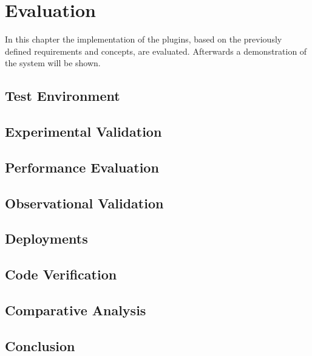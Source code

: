 \acresetall

\chapter{Evaluation}\label{chapter:evaluation}
In this chapter the implementation of the plugins, based on the previously defined requirements and concepts, are evaluated.
Afterwards a demonstration of the system will be shown.

\section{Test Environment}
\doit

\section{Experimental Validation}
\doit

\section{Performance Evaluation}
\doit

\section{Observational Validation}
\doit

\section{Deployments}
\doit

\section{Code Verification}
\doit

\section{Comparative Analysis}
\doit

\section{Conclusion}
\doit
